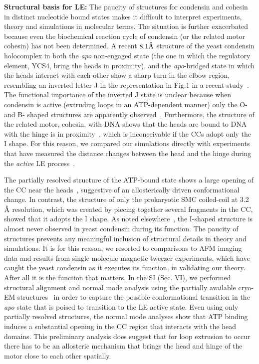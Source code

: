 \documentclass[fleqn,10pt]{wlscirep}
\newcommand{\angstrom}{\mbox{\normalfont\AA}}
\begin{document}
{\bf Structural basis for LE:}
The paucity of structures for condensin and cohesin in distinct nucleotide bound states makes it difficult to interpret experiments, theory and simulations in molecular terms.  The situation is further exacerbated because even  the biochemical reaction cycle of condensin (or the related motor cohesin) has not been determined. A recent $8.1\angstrom$ structure of the yeast condensin holocomplex in both the {\it apo} non-engaged state (the one  in which the regulatory element, YCS4, bring the heads in proximity), and the  {\it apo}-bridged state in which the heads interact with each other show a sharp turn in the elbow region, resembling an inverted letter J in the representation  in Fig.1 in a recent study~\cite{lee2020cryo}. The functional importance of the inverted J  state is unclear because when condensin is active (extruding loops in an ATP-dependent manner) only the O- and B- shaped structures are apparently observed~\cite{ryu2020condensin}. Furthermore, the structure of the related motor, cohesin, with DNA shows that the heads are bound to DNA with the hinge is in proximity~\cite{shi2020cryo}, which is inconceivable if the CCs adopt only the I shape.  For this reason, we compared our simulations directly with experiments that have measured the distance changes between the head and the hinge during the {\it active}  LE process~\cite{ryu2020condensin}.  

The partially resolved structure of the ATP-bound state shows a large opening of the CC near the heads~\cite{lee2020cryo}, suggestive of an allosterically driven conformational change.  In contrast, the structure of only the prokaryotic SMC coiled-coil at 3.2 $\angstrom$  resolution, which was created by piecing together several fragments in the CC, showed that it adopts the I shape. As noted elsewhere~\cite{ryu2020condensin}, the I-shaped structure is almost never observed in yeast condensin during its function. The paucity of structures prevents any meaningful inclusion of structural details in theory and simulations. It is for this reason, we resorted to comparisons to AFM imaging data and results from single molecule magnetic tweezer experiments, which have caught the yeast condensin as it executes its function, in validating our theory.  After all it is the function that matters. In the SI (Sec. VI), we performed structural alignment and normal mode analysis using the partially available cryo-EM structures~\cite{lee2020cryo} in order to capture the possible conformational transition in the {\it apo} state that is poised to transition to the LE active state. Even using only partially resolved structures, the normal mode analyses show that ATP binding induces a substantial opening  in the CC region that interacts with the head domains. This preliminary analysis does suggest that for loop extrusion to occur there has to be an allosteric mechanism that brings the head and hinge of the motor close to each other spatially.
\end{document}
